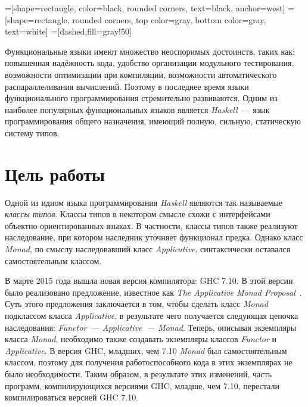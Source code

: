 


    =[shape=rectangle, color=black, rounded corners,%
    text=black, anchor=west]
    =[shape=rectangle, rounded corners,%
    top color=gray,%
    bottom color=gray, text=white]
    =[dashed,fill=gray!50]



\Intro

Функциональные языки имеют множество неоспоримых достоинств, таких как: повышенная надёжность кода, удобство организации модульного тестирования, возможности оптимизации при компиляции, возможности автоматического распараллеливания вычислений. Поэтому в последнее время языки функционального программирования стремительно развиваются. Одним из наиболее популярных функциональных языков является \textit{Haskell}~---  язык программирования общего назначения, имеющий полную, сильную, статическую систему типов.

\section*{Цель работы}
Одной из идиом языка программирования \textit{Haskell} являются так называемые \textit{классы типов}. Классы типов в некотором смысле схожи с интерфейсами  объектно-ориентированных языках. В частности, классы типов также реализуют наследование, при котором наследник уточняет функционал предка. Однако класс \textit{Monad}, по смыслу наследовавший класс \textit{Applicative}, синтаксически оставался самостоятельным классом.

В марте 2015 года вышла новая версия компилятора: GHC 7.10. В этой версии было реализовано предложение, известное как \textit{The Applicative Monad Proposal}~\autocite{AMP}. Суть этого предложения заключается в том, чтобы сделать класс \textit{Monad} подклассом класса \textit{Applicative}, в результате чего получается следующая цепочка наследования: \textit{Functor~--- Applicative~--- Monad}. Теперь, описывая экземпляры класса \textit{Monad}, необходимо также создавать экземпляры классов \textit{Functor} и \textit{Applicative}. В версия GHC, младших, чем 7.10 \textit{Monad} был самостоятельным классом, поэтому для получения работоспособного кода в этих экземплярах не было необходимости. Таким образом, в результате этих изменений, часть программ, компилирующихся версиями GHC, младше, чем 7.10, перестали компилироваться версией GHC 7.10.

